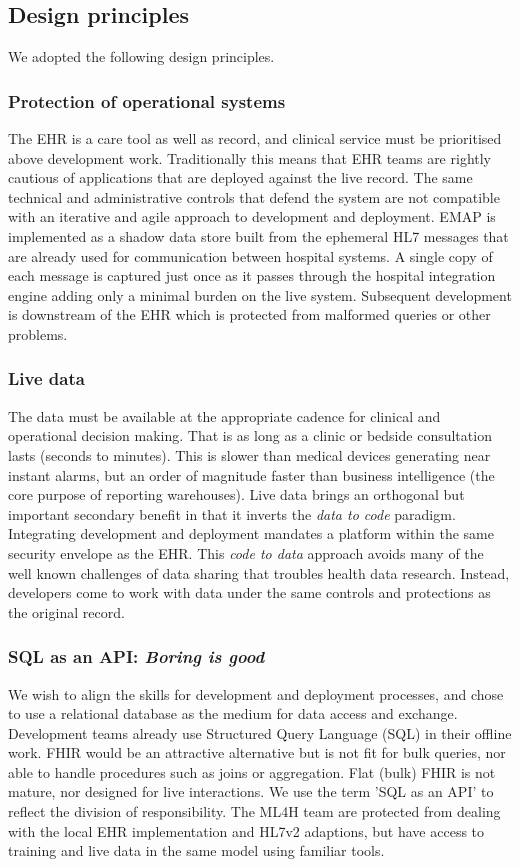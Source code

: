 \documentclass[pmlr,twocolumn,10pt]{jmlr} %
\begin{document}
\subsection{Design principles}
We adopted the following design principles.

\subsubsection{Protection of operational systems}
The EHR is a care tool as well as record, and clinical service must be prioritised above development work. Traditionally this means that EHR teams are rightly cautious of applications that are deployed against the live record. The same technical and administrative controls that defend the system are not compatible with an iterative and agile approach to development and deployment.
EMAP is implemented as a shadow data store built from the ephemeral HL7 messages that are already used for communication between hospital systems. A single copy of each message is captured just once as it passes through the hospital integration engine adding only a minimal burden on the live system. Subsequent development is downstream of the EHR which is protected from malformed queries or other problems.

\subsubsection{Live data}
The data must be available at the appropriate cadence for clinical and operational decision making. That is as long as a clinic or bedside consultation lasts (seconds to minutes). This is slower than medical devices generating near instant alarms, but an order of magnitude faster than business intelligence (the core purpose of reporting warehouses).
Live data brings an orthogonal but important secondary benefit in that it inverts the \textit{data to code} paradigm.\citep{guinney2018} Integrating development and deployment mandates a platform within the same security envelope as the EHR. This \textit{code to data} approach avoids many of the well known challenges of data sharing that troubles health data research.\citep{powles2017} Instead, developers come to work with data under the same controls and protections as the original record.

\subsubsection{SQL as an API: \textit{Boring is good}}
We wish to align the skills for development and deployment processes, and chose to use a relational database as the medium for data access and exchange. Development teams already use Structured Query Language (SQL) in their offline work. FHIR would be an attractive alternative but is not fit for bulk queries, nor able to handle procedures such as joins or aggregation.\citep{2018c} Flat (bulk) FHIR is not mature, nor designed for live interactions.\citep{2021} We use the term 'SQL as an API' to reflect the division of responsibility. The ML4H team are protected from dealing with the local EHR implementation and HL7v2 adaptions, but have access to training and live data in the same model using familiar tools.
\end{document}
